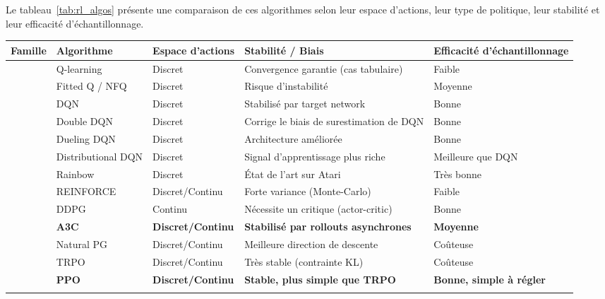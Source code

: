 Le tableau~\ref{tab:rl_algos} présente une comparaison 
de ces algorithmes selon leur espace d'actions, leur type de politique, 
leur stabilité et leur efficacité d'échantillonnage.

\begin{table}[H]
\centering
\footnotesize
\renewcommand{\arraystretch}{1.4}
\setlength{\tabcolsep}{3pt}
\begin{tabular}{|>{\centering\arraybackslash}m{2.5cm}|m{2.5cm}|m{3cm}|m{4.5cm}|m{2cm}|}
\hline
\rowcolor{gray!20}
\textbf{Famille} &
\textbf{Algorithme} &
\textbf{Espace d'actions} &
\textbf{Stabilité / Biais} &
\textbf{Efficacité d'échantillonnage} \\
\hline
\multirow{7}{*}{\centering\small Value-based}
& Q-learning & Discret & Convergence garantie (cas tabulaire) & Faible \\ \cline{2-5}
& Fitted Q / NFQ & Discret & Risque d'instabilité & Moyenne \\ \cline{2-5}
& DQN & Discret & Stabilisé par target network & Bonne \\ \cline{2-5}
& Double DQN & Discret & Corrige le biais de surestimation de DQN & Bonne \\ \cline{2-5}
& Dueling DQN & Discret & Architecture améliorée & Bonne \\ \cline{2-5}
& Distributional DQN & Discret & Signal d'apprentissage plus riche & Meilleure que DQN \\ \cline{2-5}
& Rainbow & Discret & État de l'art sur Atari & Très bonne \\
\hline
\multirow{7}{*}{\centering\small Policy gradient}
& REINFORCE & Discret/Continu & Forte variance (Monte-Carlo) & Faible \\ \cline{2-5}
& DDPG & Continu & Nécessite un critique (actor-critic) & Bonne \\ \cline{2-5}
& \cellcolor{blue!15}\textbf{A3C} & \cellcolor{blue!15}\textbf{Discret/Continu} & \cellcolor{blue!15}\textbf{Stabilisé par rollouts asynchrones} & \cellcolor{blue!15}\textbf{Moyenne} \\ \cline{2-5}
& Natural PG & Discret/Continu & Meilleure direction de descente & Coûteuse \\ \cline{2-5}
& TRPO & Discret/Continu & Très stable (contrainte KL) & Coûteuse \\ \cline{2-5}
& \cellcolor{blue!15}\textbf{PPO} & \cellcolor{blue!15}\textbf{Discret/Continu} & \cellcolor{blue!15}\textbf{Stable, plus simple que TRPO} & \cellcolor{blue!15}\textbf{Bonne, simple à régler} \\ \cline{2-5}

\end{tabular}
\end{table}
